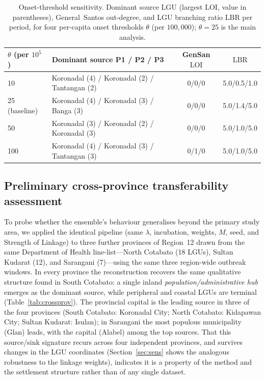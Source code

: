 \documentclass[a4paper,11pt]{article}
\begin{document}
\begin{table}[htbp]
\centering
\caption{Onset-threshold sensitivity. Dominant source LGU (largest $\mathrm{LOI}$, value in
parentheses), General~Santos out-degree, and LGU branching ratio $\mathrm{LBR}$ per
period, for four per-capita onset thresholds $\theta$ (per $100{,}000$); $\theta=25$
is the main analysis.}
\label{tab:thresh}
\small
\begin{tabular}{l>{\raggedright\arraybackslash}p{5.4cm}cc}
\toprule
\textbf{$\theta$ (per $10^5$)} & \textbf{Dominant source P1 / P2 / P3} &
\textbf{GenSan $\mathrm{LOI}$} & \textbf{$\mathrm{LBR}$} \\
\midrule
10            & Koronadal (4) / Koronadal (2) / Tantangan (2) & 0/0/0 & 5.0/0.5/1.0 \\
25 (baseline) & Koronadal (4) / Koronadal (3) / Banga (3)     & 0/0/0 & 5.0/1.4/5.0 \\
50            & Koronadal (3) / Koronadal (2) / Koronadal (3) & 0/0/0 & 5.0/1.0/5.0 \\
100           & Koronadal (4) / Koronadal (3) / Tantangan (3) & 0/1/0 & 5.0/1.0/5.0 \\
\bottomrule
\end{tabular}
\end{table}

\subsection{Preliminary cross-province transferability assessment}
\label{sec:crossprov}
To probe whether the ensemble's behaviour generalises beyond the primary study area,
we applied the identical pipeline (same $\lambda$, incubation, weights, $M$, seed,
and Strength of Linkage) to three further provinces of Region~12 drawn from the same
Department of Health line-list---North Cotabato (18 LGUs), Sultan Kudarat (12), and
Sarangani (7)---using the same three region-wide outbreak windows. In every province
the reconstruction recovers the same qualitative structure found in South Cotabato:
a single inland \emph{population/administrative hub} emerges as the dominant source,
while peripheral and coastal LGUs are terminal (Table~\ref{tab:crossprov}). The
provincial capital is the leading source in three of the four provinces
(South Cotabato: Koronadal City; North Cotabato: Kidapawan City; Sultan Kudarat:
Isulan); in Sarangani the most populous municipality (Glan) leads, with the capital
(Alabel) among the top sources. That this source/sink signature recurs across four
independent provinces, and survives changes in the LGU coordinates
(Section~\ref{sec:sens} shows the analogous robustness to the linkage weights),
indicates it is a property of the method and the settlement structure rather than of
any single dataset.
\end{document}
